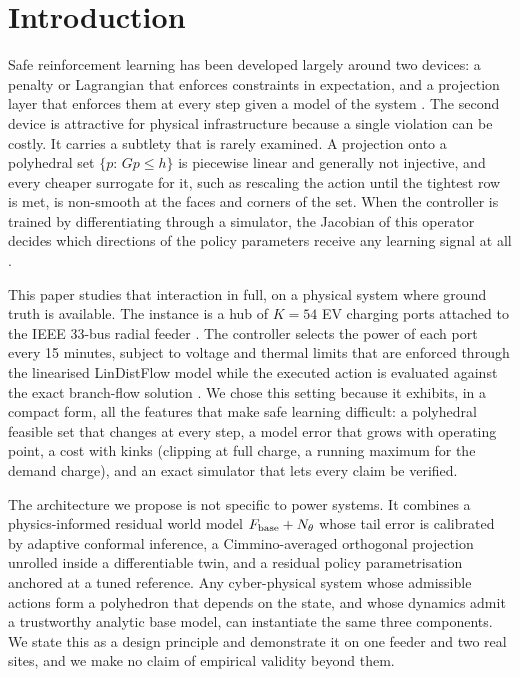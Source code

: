 \documentclass[11pt]{article}
\begin{document}
\section{Introduction}
Safe reinforcement learning has been developed largely around two devices: a penalty or Lagrangian that enforces constraints in expectation, and a projection layer that enforces them at every step given a model of the system \cite{achiam,dalal,optnet}. The second device is attractive for physical infrastructure because a single violation can be costly. It carries a subtlety that is rarely examined. A projection onto a polyhedral set $\{p:\,Gp\le h\}$ is piecewise linear and generally not injective, and every cheaper surrogate for it, such as rescaling the action until the tightest row is met, is non-smooth at the faces and corners of the set. When the controller is trained by differentiating through a simulator, the Jacobian of this operator decides which directions of the policy parameters receive any learning signal at all \cite{suh,metz}.

This paper studies that interaction in full, on a physical system where ground truth is available. The instance is a hub of $K=54$ EV charging ports attached to the IEEE 33-bus radial feeder \cite{baranwu}. The controller selects the power of each port every 15 minutes, subject to voltage and thermal limits that are enforced through the linearised LinDistFlow model while the executed action is evaluated against the exact branch-flow solution \cite{farivar}. We chose this setting because it exhibits, in a compact form, all the features that make safe learning difficult: a polyhedral feasible set that changes at every step, a model error that grows with operating point, a cost with kinks (clipping at full charge, a running maximum for the demand charge), and an exact simulator that lets every claim be verified.

The architecture we propose is not specific to power systems. It combines a physics-informed residual world model $F_{\rm base}+N_\theta$ whose tail error is calibrated by adaptive conformal inference, a Cimmino-averaged orthogonal projection \cite{cimmino,censor} unrolled inside a differentiable twin, and a residual policy parametrisation anchored at a tuned reference. Any cyber-physical system whose admissible actions form a polyhedron that depends on the state, and whose dynamics admit a trustworthy analytic base model, can instantiate the same three components. We state this as a design principle and demonstrate it on one feeder and two real sites, and we make no claim of empirical validity beyond them.
\end{document}
